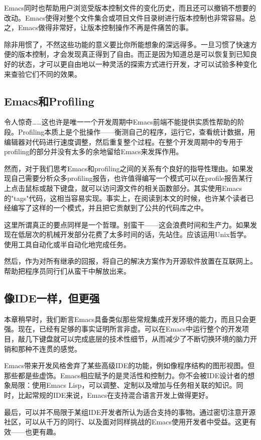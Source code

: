 \documentclass[12pt,oneside]{book}
\begin{document}
\begin{common-format}
Emacs同时也帮助用户浏览受版本控制文件的变化历史，而且还可以撤销不想要的改动。Emacs使得对整个文件集合或项目文件目录树进行版本控制也非常容易。总之，Emacs做得非常好，让版本控制操作不再是件痛苦的事。

除非用惯了，不然这些功能的意义要比你所能想象的深远得多。一旦习惯了快速方便的版本控制，才会发现真正得到了自由。而正是因为知道总是可以恢复到已知良好的状态，才可以更自由地以一种灵活的探索方式进行开发，才可以试验多种变化来查验它们不同的效果。

\subsection{Emacs和Profiling}
令人惊奇……这也许是唯一一个开发周期中Emacs前端不能提供实质性帮助的阶段。Profiling本质上是个批操作——衡测自己的程序，运行它，查看统计数据，用编辑器对代码进行速度调整，然后重复整个过程。在整个开发周期中的专用于profiling的部分并没有太多的余地留给Emacs来发挥作用。

然而，对于我们思考Emacs和profiling之间的关系有个良好的指导性理由。如果发现自己需要分析众多profiling报告，也许值得编写一个模式可以在profile报告某行上点击鼠标或敲下键盘，就可以访问源文件的相关函数部分。其实使用Emacs的"tags"代码，这相当容易实现。事实上，在阅读到本文的时候，也许某个读者已经编写了这样的一个模式，并且把它贡献到了公共的代码库之中。

这里所谓真正的要点同样是一个哲理。别蛮干——这会浪费时间和生产力。如果发现在低层次的机械开发部分花费了太多时间的话，先站住。应该运用Unix哲学。使用工具自动化或半自动化地完成任务。

然后，作为对所有继承的回报，将自己的解决方案作为开源软件放置在互联网上。帮助把程序员同行们从蛮干中解放出来。


\subsection{像IDE一样，但更强}
本章稍早时，我们断言Emacs具备类似那些常规集成开发环境的能力，而且只会更强。现在，已经有足够的事实证明所言非虚。可以在Emacs中运行整个的开发项目，敲几下键盘就可以完成底层的技术性细节，从而减少了不断切换环境的脑力开销和那种不连贯的感觉。

Emacs带来开发风格舍弃了某些高级IDE的功能，例如像程序结构的图形视图。但那些都是些虚饰。Emacs相应赋予的是灵活性和控制力。你不会被IDE设计者的想象局限：使用Emacs Lisp，可以调整、定制以及增加与任务相关联的知识。同时，比起常规的IDE来说，Emacs在支持混合语言开发上做得更好。

最后，可以并不局限于某组IDE开发者所认为适合支持的事物。通过密切注意开源社区，可以从千万的同行、以及面对同样挑战的Emacs使用开发者中受益。这更有效——也更有趣。





\end{common-format}
\end{document}
